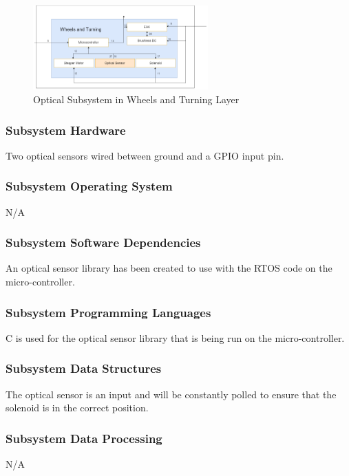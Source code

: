 \begin{figure}[h!]
	\centering
 	\includegraphics[width=0.60\textwidth]{images/Keaton/optical.png}
 \caption{Optical Subsystem in Wheels and Turning Layer}
\end{figure}

\subsubsection{Subsystem Hardware}
Two optical sensors wired between ground and a GPIO input pin.

\subsubsection{Subsystem Operating System}
N/A

\subsubsection{Subsystem Software Dependencies}
An optical sensor library has been created to use with the RTOS code on the micro-controller.

\subsubsection{Subsystem Programming Languages}
C is used for the optical sensor library that is being run on the micro-controller.

\subsubsection{Subsystem Data Structures}
The optical sensor is an input and will be constantly polled to ensure that the solenoid is in the correct position.

\subsubsection{Subsystem Data Processing}
N/A
